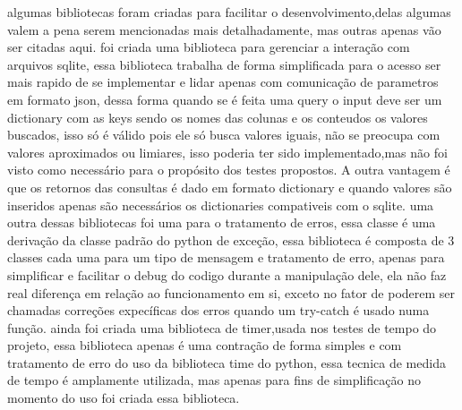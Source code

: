 \documentclass[
	12pt,				%
	openright,			%
	oneside,			%
	a4paper,			%
	english,			%
	french,				%
	spanish,			%
	brazil,				%
	]{abntex2}
\begin{document}
algumas bibliotecas foram criadas para facilitar o desenvolvimento,delas algumas valem a pena serem mencionadas mais detalhadamente,
mas outras apenas vão ser citadas aqui.
foi criada uma biblioteca para gerenciar a interação com arquivos sqlite,
essa biblioteca trabalha de forma simplificada para o acesso ser mais rapido de se implementar e lidar apenas com comunicação de parametros em formato json,
dessa forma quando se é feita uma query o input deve ser um dictionary com as keys sendo os nomes das colunas e os conteudos os valores buscados,
isso só é válido pois ele só busca valores iguais,
não se preocupa com valores aproximados ou limiares,
isso poderia ter sido implementado,mas não foi visto como necessário para o propósito dos testes propostos.
A outra vantagem é que os retornos das consultas é dado em formato dictionary e quando valores são inseridos apenas são necessários os dictionaries compativeis com o sqlite.
uma outra dessas bibliotecas foi uma para o tratamento de erros,
essa classe é uma derivação da classe padrão do python de exceção,
essa biblioteca é composta de 3 classes cada uma para um tipo de mensagem e tratamento de erro,
apenas para simplificar e facilitar o debug do codigo durante a manipulação dele,
ela não faz real diferença em relação ao funcionamento em si,
exceto no fator de poderem ser chamadas correções expecíficas dos erros quando um try-catch é usado numa função.
ainda foi criada uma biblioteca de timer,usada nos testes de tempo do projeto,
essa biblioteca apenas é uma contração de forma simples e com tratamento de erro do uso da biblioteca time do python,
essa tecnica de medida de tempo é amplamente utilizada,
mas apenas para fins de simplificação no momento do uso foi criada essa biblioteca.
\end{document}
